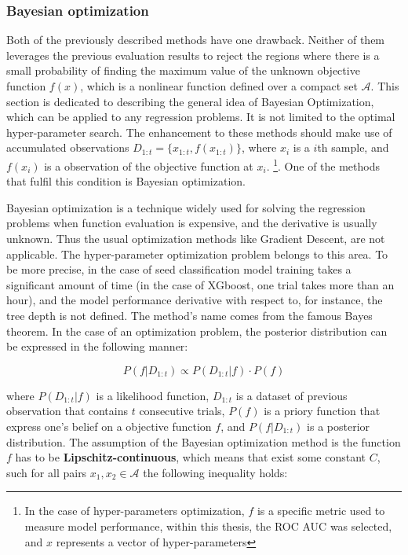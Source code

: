 \subsubsection{Bayesian optimization}
\label{sec:BayesOpt}
Both of the previously described methods have one drawback. Neither of them leverages the previous evaluation results to reject the regions where there is a small probability of finding the maximum value of the unknown objective function $f(x)$, which is a nonlinear function defined over a compact set $\mathcal{A}$. This section is dedicated to describing the general idea of Bayesian Optimization, which can be applied to any regression problems. It is not limited to the optimal hyper-parameter search. The enhancement to these methods should make use of accumulated observations $D_{1:t} = \{ x_{1:t}, f(x_{1:t}) \}$, where $x_i$ is a $i$th sample, and $f(x_i)$ is a observation of the objective function at $x_i$.   \footnote{In the case of hyper-parameters optimization, $f$ is a specific metric used to measure model performance, within this thesis, the ROC AUC was selected,  and $x$ represents a vector of hyper-parameters }. One of the methods that fulfil this condition is Bayesian optimization.  
 
Bayesian optimization is a technique widely used for solving the regression problems when function evaluation is expensive, and the derivative is usually unknown. Thus the usual optimization methods like Gradient Descent, are not applicable. The hyper-parameter optimization problem belongs to this area. To be more precise, in the case of seed classification model training takes a significant amount of time (in the case of XGboost, one trial takes more than an hour), and the model performance derivative with respect to, for instance, the tree depth is not defined.    
The method's name comes from the famous Bayes theorem. In the case of an optimization problem, the posterior distribution can be expressed in the following manner: 

\begin{equation}
\label{eq:BO_posteriori}
    P(f|D_{1:t}) \propto P(D_{1:t} | f) \cdot  P(f)
\end{equation}

where $ P(D_{1:t} | f)$ is a likelihood function, $D_{1:t}$ is a dataset of previous observation that contains $t$  consecutive trials, $P(f)$ is a priory function that express one's belief on a objective function $f$, and  $P(f|D_{1:t})$ is a posterior distribution. The assumption of the Bayesian optimization method is the function $f$ has to be \textbf{Lipschitz-continuous}, which means that exist some constant $C$, such for all pairs $x_1, x_2  \in \mathcal{A}$ the following inequality holds:

